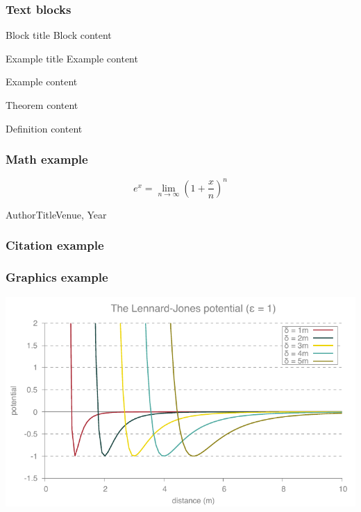 \documentclass[aspectratio=169]{beamer}
\begin{document}
\begin{frame}
  \frametitle{Text blocks}
  
  \begin{block}{Block title}
    Block content
  \end{block}

  \begin{exampleblock}{Example title}
    Example content
  \end{exampleblock}

  \begin{example}
    Example content
  \end{example}

  \begin{theorem}
    Theorem content
  \end{theorem}

  \begin{definition}
    Definition content
  \end{definition}
\end{frame}

\begin{frame}
  \frametitle{Math example}
  \begin{equation}
    e^x = \lim_{n \to \infty}\left(1 + \frac{x}{n}\right)^n
  \end{equation}
\end{frame}

\begin{citeframe}{Author}{Title}{Venue, Year}
  \frametitle{Citation example}
\end{citeframe}

\begin{frame}
  \frametitle{Graphics example}
  \centering
  \includegraphics{plot}
\end{frame}
\end{document}
